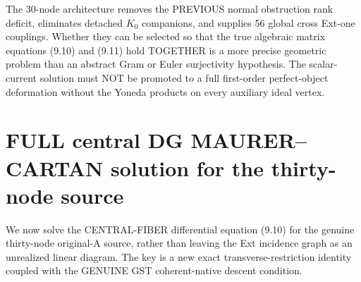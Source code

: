\documentclass[11pt,a4paper]{article}
\begin{document}
The 30-node
architecture removes
the PREVIOUS
normal obstruction
rank deficit,
eliminates detached
\(K_0\) companions,
and supplies
56 global cross
Ext-one couplings.
Whether they can
be selected so
that the true
algebraic matrix
equations (9.10)
and (9.11) hold
TOGETHER is a
more precise
geometric problem
than an abstract
Gram or Euler
surjectivity
hypothesis.
The scalar-current
solution must NOT
be promoted to a
full first-order
perfect-object
deformation
without the
Yoneda products
on every auxiliary
ideal vertex.

\section{FULL central DG MAURER--CARTAN solution for the thirty-node source}
We now solve the
CENTRAL-FIBER
differential
equation (9.10) for
the genuine
thirty-node
original-A source,
rather than
leaving the
Ext incidence
graph as an
unrealized
linear diagram.
The key is a
new exact
transverse-restriction
identity coupled
with the GENUINE
GST coherent-native
descent condition.
\end{document}
